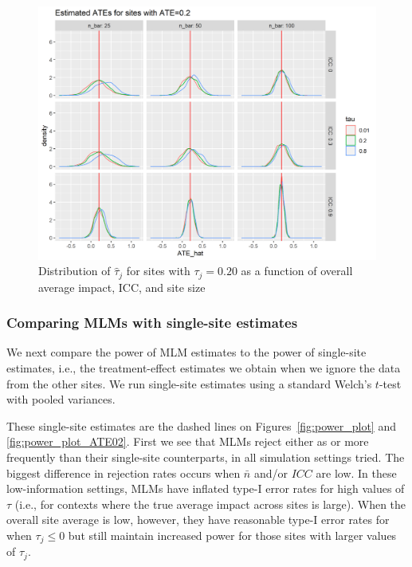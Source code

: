 \documentclass[]{article}
\begin{document}
\begin{figure}[ht]
	\centering
	\includegraphics[width=\textwidth]{power_plot_ATE02_dens}
	\caption{Distribution of $\hat{\tau}_j$ for sites with $\tau_j = 0.20$ as a function of overall average impact, ICC, and site size}
	\label{fig:power_plot_ATE02_dens}
\end{figure}


\subsubsection{Comparing MLMs with single-site estimates}

We next compare the power of MLM estimates to the power of single-site estimates, i.e., the treatment-effect estimates we obtain when we ignore the data from the other sites.
We run single-site estimates using a standard Welch's $t$-test with pooled variances.

These single-site estimates are the dashed lines on Figures~\ref{fig:power_plot} and \ref{fig:power_plot_ATE02}.
First we see that MLMs reject either as or more frequently than their single-site counterparts, in all simulation settings tried.
The biggest difference in rejection rates occurs when $\bar{n}$ and/or $ICC$ are low.
In these low-information settings, MLMs have inflated type-I error rates for high values of $\tau$ (i.e., for contexts where the true average impact across sites is large).
When the overall site average is low, however, they have reasonable type-I error rates for when $\tau_j \leq 0$ but still maintain increased power for those sites with larger values of $\tau_j$.
\end{document}
